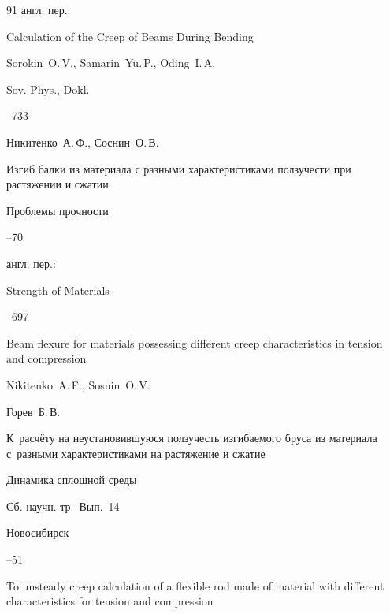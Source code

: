 \begin{thebibliography}{91}
\transl англ. пер.:~

\paper Calculation of the Creep of Beams During Bending

\by Sorokin~O.\,V., Samarin~Yu.\,P., Oding~I.\,A.

\jour Sov. Phys., Dokl.


--733







\by Никитенко~А.\,Ф., Соснин~О.\,В.

\paper Изгиб балки из материала с разными характеристиками ползучести при растяжении и сжатии

\jour Проблемы прочности



--70

\transl англ. пер.:~

\jour Strength of Materials



--697



\paper Beam flexure for materials possessing different creep characteristics in tension and compression

\by  Nikitenko~A.\,F.,  Sosnin~O.\,V.






\by Горев~Б.\,В.

\paper К~расчёту на неустановившуюся ползучесть изгибаемого бруса из материала с~разными характеристиками на растяжение и сжатие

\inbook Динамика сплошной среды

\bookinfo Сб. научн. тр.~Вып.~14

\publaddr Новосибирск


--51

\misctransl

\paper To unsteady creep calculation of a flexible rod made of material with different characteristics for tension and compression


\end{thebibliography}
